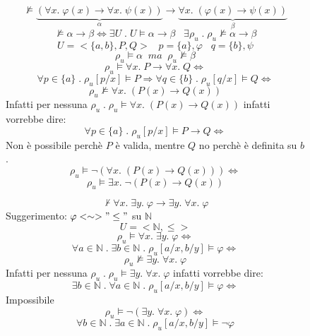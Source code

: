 \documentclass{article}
\theoremstyle{break}
\theoremstyle{break}
\theoremstyle{break}
\theoremstyle{break}
\begin{document}
\begin{figure}[H]
  \begin{exercise}[a casa]
    \[
      \not\models \underbrace{(\forall x.\; \varphi (x) \to \forall x.\; \psi(x))}_{\alpha} \to \underbrace{\forall x.\; (\varphi(x) \to \psi(x))}_{\beta}
    \] 
    \[
    \not\models \alpha \to \beta \Leftrightarrow \exists U \;.\; U \models \alpha \to \beta \;\;\; \exists \rho_u \;.\; \rho_u \not\models \alpha \to \beta
    \] 
    \[
    U = <\{a,b\}, P, Q> \;\;\; p = \{a\} , \varphi  \;\;\; q = \{b\} , \psi 
    \]
    \[
      \rho_u \models \alpha \;\; ma \;\; \rho_u \not\models \beta
    \]
    \[
      \rho_u \models \forall x.\; P \to \forall x.\; Q \Leftrightarrow
    \] 
    \[
      \forall p \in \{a\} \;.\; \rho_u[p/x] \models P \Rightarrow \forall q \in \{b\} \;.\; \rho_u[q/x] \models Q \Leftrightarrow
    \] 
    \[
      \rho_u \not\models \forall x.\; (P(x) \to Q(x))
    \] 
    Infatti per nessuna \( \rho_u \;.\; \rho_u \models \forall x.\; (P(x) \to Q(x)) \) infatti vorrebbe dire:
    \[
      \forall p \in \{a\} \;.\; \rho_u[p/x] \models P \to Q \Leftrightarrow
    \] 
    Non è possibile perchè \( P \) è valida, mentre \( Q \) no perchè è definita su \( b \).
    \[
      \rho_u \models \neg(\forall x.\; (P(x) \to Q(x))) \Leftrightarrow
    \] 
    \[
      \rho_u \models \exists x.\; \neg(P(x) \to Q(x)) 
    \] 
  \end{exercise}
\end{figure}

\begin{figure}[H]
  \begin{exercise}[a casa]
    \[
    \not\vdash \forall x.\; \exists y.\; \varphi \to \exists y.\; \forall x.\; \varphi
    \] 
    Suggerimento: \( \varphi <\sim> "\le" \) su \( \mathbb{N} \) 
    \[
    U = <\mathbb{N}, \le>
    \]
    \[
      \rho_u \models \forall x.\; \exists y.\; \varphi  \Leftrightarrow
    \]
    \[
      \forall a \in \mathbb{N} \;.\; \exists b \in \mathbb{N} \;.\; \rho_u[a/x, b/y] \models \varphi  \Leftrightarrow
    \]
    \[
      \rho_u \not\models \exists y.\; \forall x.\; \varphi 
    \]
    Infatti per nessuna \( \rho_u \;.\; \rho_u \models \exists y.\; \forall x.\; \varphi  \) infatti vorrebbe dire:
    \[
      \exists b \in \mathbb{N} \;.\; \forall a \in \mathbb{N} \;.\; \rho_u[a/x, b/y] \models \varphi  \Leftrightarrow
    \]
    Impossibile
    \[
      \rho_u \models \neg(\exists y.\; \forall x.\; \varphi ) \Leftrightarrow
    \]
    \[
      \forall b \in \mathbb{N} \;.\; \exists a \in \mathbb{N} \;.\; \rho_u[a/x, b/y] \models \neg \varphi
    \]
  \end{exercise}
\end{figure}
\end{document}
